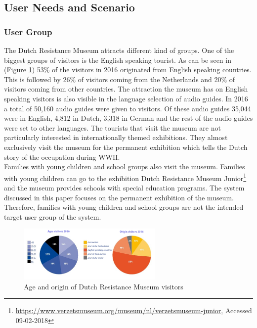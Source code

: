 \subsection{User Needs and Scenario} \label{persona}

\subsubsection{User Group}

The Dutch Resistance Museum attracts different kind of groups. One of the biggest groups of visitors is the English speaking tourist. As can be seen in (Figure \ref{Graphs}) 53\% of the visitors in 2016 originated from English speaking countries. This is followed by 26\% of visitors coming from the Netherlands and 20\% of visitors coming from other countries. The attraction the museum has on English speaking visitors is also visible in the language selection of audio guides. In 2016 a total of 50,160 audio guides were given to visitors. Of these audio guides 35,044 were in English, 4,812 in Dutch, 3,318 in German and the rest of the audio guides were set to other languages\cite{CommissariaatvoordeMedia2016}. The tourists that visit the museum are not particularly interested in internationally themed exhibitions. They almost exclusively visit the museum for the permanent exhibition which tells the Dutch story of the occupation during WWII\cite{VerzetsmuseumAmsterdam2017Ondernemingsplan2017-2020}. \\

Families with young children and school groups also visit the museum. Families with young children can go to the exhibition Dutch Resistance Museum Junior\footnote{\url{https://www.verzetsmuseum.org/museum/nl/verzetsmuseum-junior}, Accessed 09-02-2018} and the museum provides schools with special education programs. The system discussed in this paper focuses on the permanent exhibition of the museum. Therefore, families with young children and school groups are not the intended target user group of the system.

\begin{figure} [H]
\includegraphics[width=7cm]{assets/Graphs.JPG}
\caption{Age and origin of Dutch Resistance Museum visitors\cite{CommissariaatvoordeMedia2016}}
\centering
\label{Graphs}
\end{figure}

